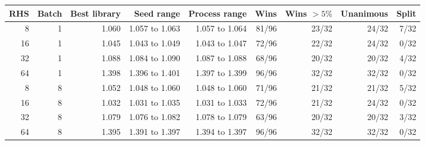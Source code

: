 \begin{tabular}{rrrrrrrrr}
\toprule
RHS & Batch & Best library & Seed range & Process range & Wins & Wins \(>5\%\) & Unanimous & Split\\
\midrule
8 & 1 & 1.060 & 1.057 to 1.063 & 1.057 to 1.064 & 81/96 & 23/32 & 24/32 & 7/32\\
16 & 1 & 1.045 & 1.043 to 1.049 & 1.043 to 1.047 & 72/96 & 22/32 & 24/32 & 0/32\\
32 & 1 & 1.088 & 1.084 to 1.090 & 1.087 to 1.088 & 68/96 & 20/32 & 20/32 & 4/32\\
64 & 1 & 1.398 & 1.396 to 1.401 & 1.397 to 1.399 & 96/96 & 32/32 & 32/32 & 0/32\\
8 & 8 & 1.052 & 1.048 to 1.060 & 1.048 to 1.060 & 71/96 & 21/32 & 21/32 & 5/32\\
16 & 8 & 1.032 & 1.031 to 1.035 & 1.031 to 1.033 & 72/96 & 21/32 & 24/32 & 0/32\\
32 & 8 & 1.079 & 1.076 to 1.082 & 1.078 to 1.079 & 63/96 & 20/32 & 20/32 & 3/32\\
64 & 8 & 1.395 & 1.391 to 1.397 & 1.394 to 1.397 & 96/96 & 32/32 & 32/32 & 0/32\\
\bottomrule
\end{tabular}
